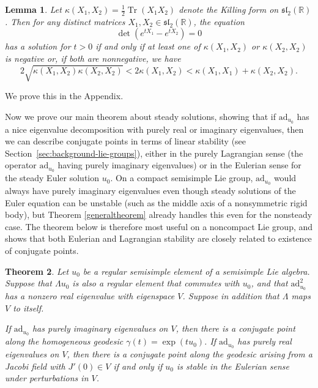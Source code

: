 \documentclass[oneside, 11pt]{amsart}
\newtheorem{theorem}{Theorem}[section]
\newtheorem{lemma}[theorem]{Lemma}
\numberwithin{equation}{section}
\DeclareMathOperator{\Tr}{Tr}
\newcommand{\ad}{\mathrm{ad}}
\newcommand{\simpkill}{\kappa}
\newcommand{\mattyone}{X_1}
\newcommand{\mattytwo}{X_2}
\begin{document}
\begin{lemma}\label{determinantlemma}
    Let $\simpkill(\mattyone,\mattytwo)=\tfrac{1}{2}\Tr(\mattyone\mattytwo)$ denote the Killing form on $\mathfrak{sl}_2(\mathbb{R})$. Then for any distinct matrices $\mattyone,\mattytwo\in\mathfrak{sl}_2(\mathbb{R})$, the equation $$\det{(e^{t\mattyone}-e^{t\mattytwo})} = 0$$
    has a solution for $t>0$ if and only if at least one of $\simpkill(\mattyone,\mattytwo)$ or $\simpkill(\mattytwo,\mattytwo)$ is negative or, if both are nonnegative, we have
\begin{equation}\label{sl2condition}
2\sqrt{\simpkill(\mattyone,\mattytwo)\simpkill(\mattytwo,\mattytwo)} < 2\simpkill(\mattyone,\mattytwo) < \simpkill(\mattyone,\mattyone)+\simpkill(\mattytwo,\mattytwo).
    \end{equation}
\end{lemma}
 
We prove this in the Appendix. 

Now we prove our main theorem about steady solutions, showing that if $\ad_{u_0}$ has a nice eigenvalue decomposition with purely real or imaginary eigenvalues, then we can describe conjugate points in terms of linear stability (see Section~\ref{sec:background-lie-groups}), either in the purely Lagrangian sense 
(the operator $\ad_{u_0}$ having purely imaginary eigenvalues) or in the Eulerian sense 
for the steady Euler solution $u_0$. 
On a compact semisimple Lie group, $\ad_{u_0}$ would always have purely imaginary eigenvalues even though steady solutions of the Euler equation can be unstable (such as the middle axis of a nonsymmetric rigid body), but Theorem \ref{generaltheorem} already handles this even for the nonsteady case. The theorem below is therefore most useful on a noncompact Lie group, and shows that both Eulerian and Lagrangian stability are closely related to existence of conjugate points.

 

\begin{theorem}\label{cartan_thm}
    Let $u_0$ be a regular semisimple element of a semisimple Lie algebra.  
    Suppose that $\Lambda u_0$ is also a regular element that commutes with $u_0$, and that $\ad_{u_0}^2$ has a nonzero real eigenvalue with eigenspace $V$. Suppose in addition that $\Lambda$ maps $V$ to itself.
    
    If $\ad_{u_0}$ has purely imaginary eigenvalues on $V$, then there is a conjugate point along the homogeneous geodesic $\gamma(t) = \exp{(tu_0)}$. If $\ad_{u_0}$ has purely real eigenvalues on $V$, then there is a conjugate point along the geodesic arising from a Jacobi field with $J'(0)\in V$ if and only if $u_0$ is stable in the Eulerian sense under perturbations in $V$. 
\end{theorem}
\end{document}
